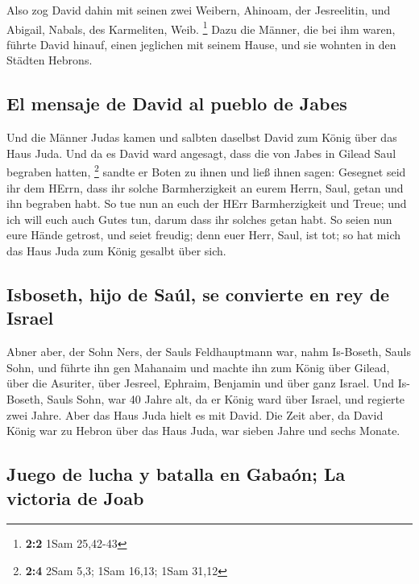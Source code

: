  Also zog David dahin mit seinen zwei Weibern, Ahinoam,
der Jesreelitin, und Abigail, Nabals, des Karmeliten, Weib. \footnote{\textbf{2:2}
  1Sam 25,42-43}  Dazu die Männer, die bei ihm waren,
führte David hinauf, einen jeglichen mit seinem Hause, und sie wohnten
in den Städten Hebrons.

\hypertarget{el-mensaje-de-david-al-pueblo-de-jabes}{%
\subsection{El mensaje de David al pueblo de
Jabes}\label{el-mensaje-de-david-al-pueblo-de-jabes}}

 Und die Männer Judas kamen und salbten daselbst David zum
König über das Haus Juda. Und da es David ward angesagt, dass die von
Jabes in Gilead Saul begraben hatten, \footnote{\textbf{2:4} 2Sam 5,3;
  1Sam 16,13; 1Sam 31,12}  sandte er Boten zu ihnen und
ließ ihnen sagen: Gesegnet seid ihr dem HErrn, dass ihr solche
Barmherzigkeit an eurem Herrn, Saul, getan und ihn begraben habt.
 So tue nun an euch der HErr Barmherzigkeit und Treue; und
ich will euch auch Gutes tun, darum dass ihr solches getan habt.
 So seien nun eure Hände getrost, und seiet freudig; denn
euer Herr, Saul, ist tot; so hat mich das Haus Juda zum König gesalbt
über sich.

\hypertarget{isboseth-hijo-de-sauxfal-se-convierte-en-rey-de-israel}{%
\subsection{Isboseth, hijo de Saúl, se convierte en rey de
Israel}\label{isboseth-hijo-de-sauxfal-se-convierte-en-rey-de-israel}}

 Abner aber, der Sohn Ners, der Sauls Feldhauptmann war,
nahm Is-Boseth, Sauls Sohn, und führte ihn gen Mahanaim 
und machte ihn zum König über Gilead, über die Asuriter, über Jesreel,
Ephraim, Benjamin und über ganz Israel.  Und Is-Boseth,
Sauls Sohn, war 40 Jahre alt, da er König ward über Israel, und regierte
zwei Jahre. Aber das Haus Juda hielt es mit David.  Die
Zeit aber, da David König war zu Hebron über das Haus Juda, war sieben
Jahre und sechs Monate.

\hypertarget{juego-de-lucha-y-batalla-en-gabauxf3n-la-victoria-de-joab}{%
\subsection{Juego de lucha y batalla en Gabaón; La victoria de
Joab}\label{juego-de-lucha-y-batalla-en-gabauxf3n-la-victoria-de-joab}}

